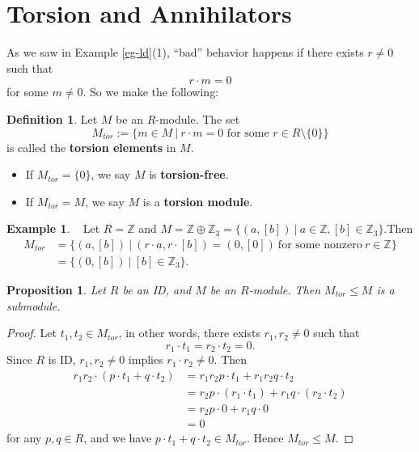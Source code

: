 \documentclass[11pt,openany]{book}
\theoremstyle{plain}
\newtheorem{proposition}[proposition]{Proposition}
\theoremstyle{definition}
\newtheorem{definition}[definition]{Definition}
\newtheorem{example}[example]{Example}
\theoremstyle{remark}
\begin{document}
\section{Torsion and Annihilators}
As we saw in Example \ref{eg-ld}(1), ``bad'' behavior happens if there exists $r\neq0$ such that $$r\cdot m=0$$
for some $m\neq0$. So we make the following:
\begin{definition}
    Let $M$ be an $R$-module. The set 
    $$M_{tor}:=\{m\in M\ |\ r\cdot m=0 \text{ for some }r\in R\setminus\{0\}\}$$
    is called the {\bf torsion elements} in $M$.
    \begin{itemize}
        \item If $M_{tor}=\{0\}$, we say $M$ is {\bf torsion-free}.
        \item If $M_{tor}=M$, we say $M$ is a {\bf torsion module}.
    \end{itemize}
\end{definition}

\begin{example} \label{eg-torsionelements}\
     Let $R=\mathbb{Z}$ and $M=\mathbb{Z}\oplus\mathbb{Z}_{3}=\{(a,[b])\ |\ a\in\mathbb{Z},[b]\in\mathbb{Z}_{3}\}$.Then
        \begin{align*}
            M_{tor}&=\{(a,[b])\ |\ (r\cdot a,r \cdot[b])=(0,[0])\ \text{for some nonzero}\ r \in \mathbb{Z}\}\\
            &=\{(0,[b])\ |\ [b]\in\mathbb{Z}_{3}\}.
        \end{align*}
\end{example}

\begin{proposition} \label{torsionsubmodule}
    Let $R$ be an ID, and $M$ be an $R$-module. Then $M_{tor} \leq M$ is a submodule.
\end{proposition}

\begin{proof}
    Let $t_1,t_2\in M_{tor}$, in other words, there exists $r_1,r_2\neq0$ such that 
    $$r_1\cdot t_1=r_2\cdot t_2=0.$$
    Since $R$ is ID, $r_1,r_2\neq0$ implies $r_1\cdot r_2\neq0$. Then
    \begin{align*}
        r_1r_2\cdot(p\cdot t_1+q\cdot t_2)&=r_1r_2p\cdot t_1+r_1r_2q\cdot t_2\\
        &=r_2p\cdot(r_1\cdot t_1)+r_1q\cdot(r_2\cdot t_2)\\
        &=r_2p\cdot0+r_1q\cdot0\\
        &=0
    \end{align*}
    for any $p,q\in R$, and we have $p\cdot t_1+q\cdot t_2\in M_{tor}$. Hence $M_{tor} \leq M$.
\end{proof}
\end{document}
